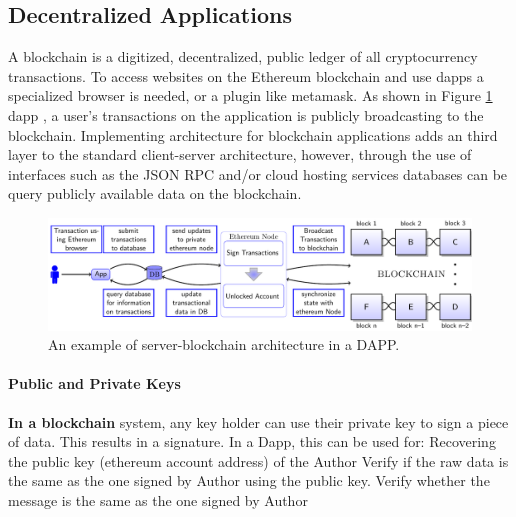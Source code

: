 
\subsection{Decentralized Applications}
	A blockchain is a digitized, decentralized, public ledger of all cryptocurrency transactions. To access websites on the Ethereum blockchain and use dapps a specialized browser is needed, or a plugin like metamask. As shown in 
	Figure \ref{fig:dappArc} dapp \footnotemark, a user's transactions on the application is publicly broadcasting to the blockchain. 
	Implementing architecture for blockchain 
	applications \footnotemark adds an third layer to the standard client-server architecture, however, through the use of interfaces such as the JSON RPC and/or cloud hosting
	 services \footnotemark databases can be query publicly available data on the blockchain. 
	 
\begin{figure}[ht]
\begin{adjustbox}{center,max width=1.1\textwidth}
\includegraphics[width=1.2\linewidth]{Diagrams/blockchainInSimpleApp.pdf}
\end{adjustbox}
\caption{An example of server-blockchain architecture in a DAPP.}
\label{fig:dappArc}
\end{figure}

\paragraph{Public and Private Keys}
 \textbf{In a blockchain} system, any key holder can use their private key to sign a piece of data. This results in a signature. In a Dapp, this can be used for:
	Recovering the public key (ethereum account address) of the Author
	Verify if the raw data is the same as the one signed by Author using the public key. 
	Verify whether the message is the same as the one signed by Author
	
	
